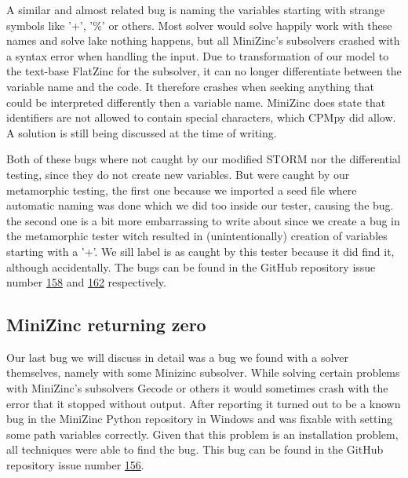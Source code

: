 A similar and almost related bug is naming the variables starting with strange symbols like '+', '\%' or others. Most solver would solve happily work with these names and solve lake nothing happens, but all MiniZinc's subsolvers crashed with a syntax error when handling the input. Due to transformation of our model to the text-base FlatZinc for the subsolver, it can no longer differentiate between the variable name and the code. It therefore crashes when seeking anything that could be interpreted differently then a variable name. MiniZinc does state that identifiers  are not allowed to contain special characters, which CPMpy did allow. A solution is still being discussed at the time of writing.


Both of these bugs where not caught by our modified STORM nor the differential testing, since they do not create new variables. But were caught by our metamorphic testing, the first one because we imported a seed file where automatic naming was done which we did too inside our tester, causing the bug. the second one is a bit more embarrassing to write about since we create a bug in the metamorphic tester witch resulted in (unintentionally) creation of variables starting with a '+'. We sill label is as caught by this tester because it did find it, although accidentally. The bugs can be found in the GitHub repository issue number \href{https://github.com/CPMpy/cpmpy/issues/158}{158} and \href{https://github.com/CPMpy/cpmpy/issues/162}{162} respectively.


\subsection{MiniZinc returning zero}
\label{res:bug:MinizincZero}
Our last bug we will discuss in detail was a bug we found with a solver themselves, namely with some Minizinc subsolver. While solving certain problems with MiniZinc's subsolvers Gecode or others it would sometimes crash with the error that it stopped without output. After reporting it turned out to be a known bug in the MiniZinc Python repository in Windows and was fixable with setting some path variables correctly. Given that this problem is an installation problem, all techniques were able to find the bug. This bug can be found in the GitHub repository issue number \href{https://github.com/CPMpy/cpmpy/issues/156}{156}.

%
%


